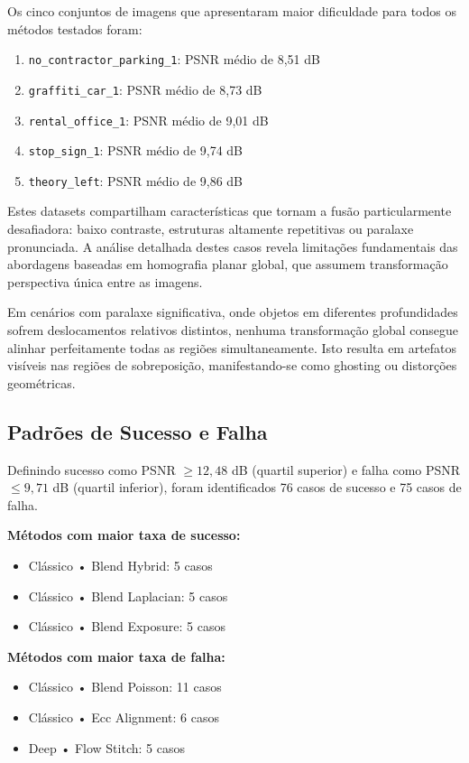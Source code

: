 Os cinco conjuntos de imagens que apresentaram maior dificuldade para todos os métodos testados foram:

\begin{enumerate}
    \item \texttt{no\_contractor\_parking\_1}: PSNR médio de 8,51 dB
    \item \texttt{graffiti\_car\_1}: PSNR médio de 8,73 dB
    \item \texttt{rental\_office\_1}: PSNR médio de 9,01 dB
    \item \texttt{stop\_sign\_1}: PSNR médio de 9,74 dB
    \item \texttt{theory\_left}: PSNR médio de 9,86 dB
\end{enumerate}

Estes datasets compartilham características que tornam a fusão particularmente desafiadora: baixo contraste, estruturas altamente repetitivas ou paralaxe pronunciada. A análise detalhada destes casos revela limitações fundamentais das abordagens baseadas em homografia planar global, que assumem transformação perspectiva única entre as imagens.

Em cenários com paralaxe significativa, onde objetos em diferentes profundidades sofrem deslocamentos relativos distintos, nenhuma transformação global consegue alinhar perfeitamente todas as regiões simultaneamente. Isto resulta em artefatos visíveis nas regiões de sobreposição, manifestando-se como ghosting ou distorções geométricas.

\subsection{Padrões de Sucesso e Falha}

Definindo sucesso como PSNR $\geq 12{,}48$ dB (quartil superior) e falha como PSNR $\leq 9{,}71$ dB (quartil inferior), foram identificados 76 casos de sucesso e 75 casos de falha.

\textbf{Métodos com maior taxa de sucesso:}
\begin{itemize}
    \item Clássico • Blend Hybrid: 5 casos
    \item Clássico • Blend Laplacian: 5 casos
    \item Clássico • Blend Exposure: 5 casos
\end{itemize}

\textbf{Métodos com maior taxa de falha:}
\begin{itemize}
    \item Clássico • Blend Poisson: 11 casos
    \item Clássico • Ecc Alignment: 6 casos
    \item Deep • Flow Stitch: 5 casos
\end{itemize}

